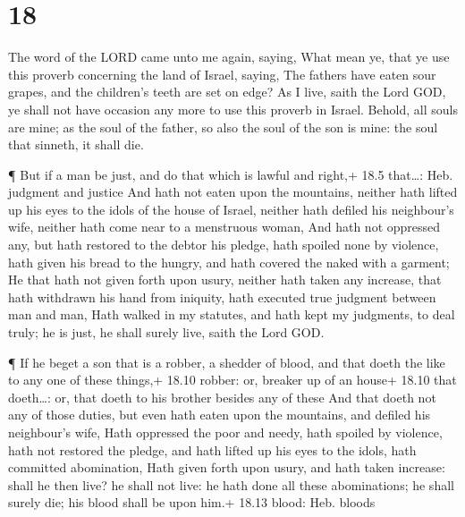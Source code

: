 \hypertarget{section-17}{%
\section{18}\label{section-17}}

 The word of the LORD came unto me again, saying,
 What mean ye, that ye use this proverb concerning the land
of Israel, saying, The fathers have eaten sour grapes, and the
children's teeth are set on edge?  As I live, saith the Lord
GOD, ye shall not have occasion any more to use this proverb in Israel.
 Behold, all souls are mine; as the soul of the father, so
also the soul of the son is mine: the soul that sinneth, it shall die.

 ¶ But if a man be just, and do that which is lawful and
right,+ 18.5 that\ldots: Heb. judgment and justice  And hath
not eaten upon the mountains, neither hath lifted up his eyes to the
idols of the house of Israel, neither hath defiled his neighbour's wife,
neither hath come near to a menstruous woman,  And hath not
oppressed any, but hath restored to the debtor his pledge, hath spoiled
none by violence, hath given his bread to the hungry, and hath covered
the naked with a garment;  He that hath not given forth upon
usury, neither hath taken any increase, that hath withdrawn his hand
from iniquity, hath executed true judgment between man and man,
 Hath walked in my statutes, and hath kept my judgments, to
deal truly; he is just, he shall surely live, saith the Lord GOD.

 ¶ If he beget a son that is a robber, a shedder of blood,
and that doeth the like to any one of these things,+ 18.10 robber: or,
breaker up of an house+ 18.10 that doeth\ldots: or, that doeth to his
brother besides any of these  And that doeth not any of
those duties, but even hath eaten upon the mountains, and defiled his
neighbour's wife,  Hath oppressed the poor and needy, hath
spoiled by violence, hath not restored the pledge, and hath lifted up
his eyes to the idols, hath committed abomination,  Hath
given forth upon usury, and hath taken increase: shall he then live? he
shall not live: he hath done all these abominations; he shall surely
die; his blood shall be upon him.+ 18.13 blood: Heb. bloods

